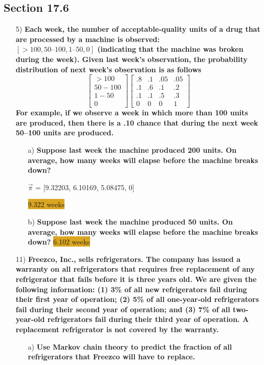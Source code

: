 \documentclass{article}
\begin{document}
\subsection*{Section 17.6}
\begin{enumerate}
\item[5) ] \textbf{Each week, the number of acceptable-quality units of a drug that are processed by a machine is observed: \\$\left[>100, 50–100, 1–50, 0\right]$ (indicating that the machine was broken during the week). Given last week’s observation, the probability distribution of next week’s observation is as follows}
\[
\begin{bmatrix}
>100\\
50-100\\
1-50\\
0
\end{bmatrix}
\begin{bmatrix}
.8 & .1 & .05 & .05\\
.1 & .6 & .1 & .2\\
.1 & .1 & .5 & .3\\
0 & 0 & 0 & 1
\end{bmatrix}
\]
\textbf{For example, if we observe a week in which more than 100 units are produced, then there is a .10 chance that during the next week 50–100 units are produced.}
\begin{enumerate}
\item[a) ] \textbf{Suppose last week the machine produced 200 units. On average, how many weeks will elapse before the machine breaks down?}


$\vec{\pi}$ = [9.32203,  6.10169,  5.08475,  0] 

\colorbox{Goldenrod}{9.322 weeks}


\item[b) ] \textbf{Suppose last week the machine produced 50 units. On average, how many weeks will elapse before the machine breaks
down?}
\colorbox{Goldenrod}{6.102 weeks}


\end{enumerate}

\item[11) ] \textbf{Freezco, Inc., sells refrigerators. The company has issued a warranty on all refrigerators that requires free replacement of any refrigerator that fails before it is three years old. We are given the following information: (1) 3\% of all new refrigerators fail during their first year of operation; (2) 5\% of all one-year-old refrigerators fail during their second year of operation; and (3) 7\% of all two-year-old refrigerators fail during their third year of operation. A replacement refrigerator is not covered by the warranty.}
\begin{enumerate}
\item[a) ] \textbf{Use Markov chain theory to predict the fraction of all refrigerators that Freezco will have to replace.}


\end{enumerate}
\end{enumerate}
\end{document}
